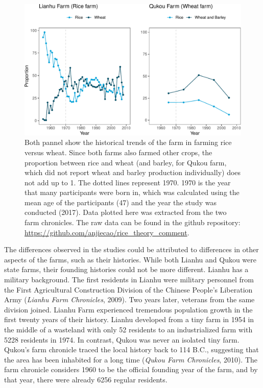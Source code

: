 \documentclass[
  man]{apa6}
\begin{document}
\begin{figure}
\centering
\includegraphics{comment_files/figure-latex/unnamed-chunk-2-1.pdf}
\caption{\label{fig:unnamed-chunk-2}Both pannel show the historical trends of the farm in farming rice versus wheat. Since both farms also farmed other crops, the proportion between rice and wheat (and barley, for Qukou farm, which did not report wheat and barley production individually) does not add up to 1. The dotted lines represent 1970. 1970 is the year that many participants were born in, which was calculated using the mean age of the participants (47) and the year the study was conducted (2017). Data plotted here was extracted from the two farm chronicles. The raw data can be found in the github repository: \url{https://github.com/anjiecao/rice_theory_comment}.}
\end{figure}

The differences observed in the studies could be attributed to differences in other aspects of the farms, such as their histories. While both Lianhu and Qukou were state farms, their founding histories could not be more different. Lianhu has a military background. The first residents in Lianhu were military personnel from the First Agricultural Construction Division of the Chinese People's Liberation Army (\emph{Lianhu Farm Chronicles}, 2009). Two years later, veterans from the same division joined. Lianhu Farm experienced tremendous population growth in the first twenty years of their history. Lianhu developed from a tiny farm in 1954 in the middle of a wasteland with only 52 residents to an industrialized farm with 5228 residents in 1974. In contrast, Qukou was never an isolated tiny farm. Qukou's farm chronicle traced the local history back to 114 B.C., suggesting that the area has been inhabited for a long time (\emph{Qukou Farm Chronicles}, 2010). The farm chronicle considers 1960 to be the official founding year of the farm, and by that year, there were already 6256 regular residents.
\end{document}
